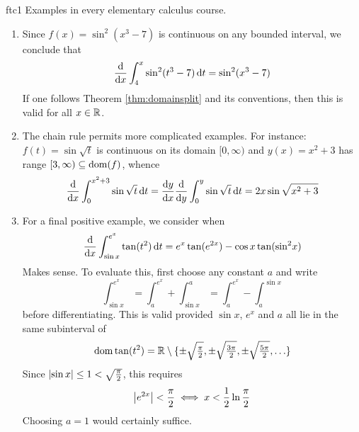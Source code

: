 \begin{examples}{}{ftc1}
	Examples in every elementary calculus course.
	\begin{enumerate}
	  \item Since $f(x)=\sin^2(x^3-7)$ is continuous on any bounded interval, we conclude that
	  \[
	  	\diff x\int_4^x\sin^2(t^3-7)\,\dt=\sin^2(x^3-7)
	  \]
	  If one follows Theorem \ref{thm:domainsplit} and its conventions, then this is valid for all $x\in\R$.
	  
	  
	  \item The chain rule permits more complicated examples. For instance: $f(t)=\sin\sqrt t$ is continuous on its domain $[0,\infty)$ and $y(x)=x^2+3$ has range $[3,\infty)\subseteq\dom(f)$, whence
	  \[
	  	\diff x\int_0^{x^2+3}\sin\sqrt t\,\dt 
	  	=\diff[y]{x}\diff y\int_0^{y}\sin\sqrt t\,\dt
	  	=2x\sin\sqrt{x^2+3}
	  \]
	  
	  
	  \item For a final positive example, we consider when
	  \[
			\diff x\int_{\sin x}^{e^x} \tan(t^2)\,\dt 
			=e^x\tan(e^{2x}) -\cos x\tan(\sin^2\!x)
		\]
	  Makes sense. To evaluate this, first choose any constant $a$ and write
	  \[
	  	\int_{\sin x}^{e^x} 
	  	=\int_a^{e^x}+\int_{\sin x}^a 
	  	=\int_a^{e^x}-\int_a^{\sin x}
	  \]
	  before differentiating. This is valid provided $\sin x$, $e^x$ and $a$ all lie in the same subinterval of
	  \[
	  	\dom\tan(t^2) =\R\setminus\{\pm\sqrt{\tfrac\pi 2},
	  	\pm\sqrt{\tfrac{3\pi}2},
	  	\pm\sqrt{\tfrac{5\pi}2},
	  	\ldots\}
	  \]
	  Since $\nm{\sin x}\le 1<\sqrt{\frac\pi 2}$, this requires
	  \[
	  	\nm{e^{2x}}<\frac\pi 2 \iff x<\frac 12\ln\frac\pi 2
	  \]
	  Choosing $a=1$ would certainly suffice.
	  

\end{enumerate}
\end{examples}

